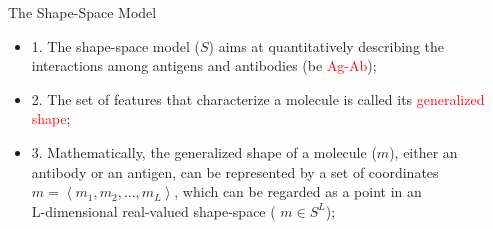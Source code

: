 \begin{frame}{The Shape-Space Model}
\begin{itemize}
\item{1. The shape-space model (\begin{math} S\end{math}) aims at quantitatively describing the interactions among antigens and antibodies (be \textcolor{red}{Ag-Ab});}
\item{2. The set of features that characterize a molecule is called its \textcolor{red}{generalized shape};}
\item{
3. Mathematically, the generalized shape of a molecule (\begin{math} m\end{math}), either an antibody or an antigen, can be represented by a set of coordinates \begin{math} m =\left \langle m_1, m_2,..., m_L\right \rangle \end{math}, which can be regarded as a point in an \\
L-dimensional real-valued shape-space ( \begin{math} m \in S^L \end{math});
}
\end{itemize}
\end{frame}




